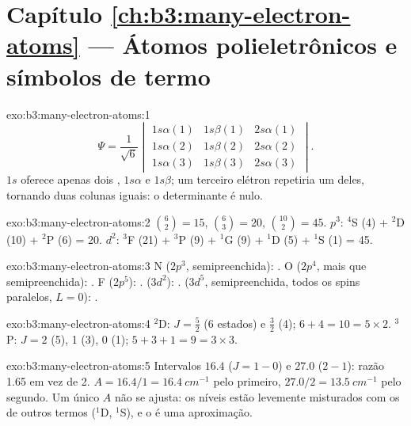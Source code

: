 \section*{Capítulo \ref{ch:b3:many-electron-atoms} --- Átomos polieletrônicos e símbolos de termo}

\begin{solution}{exo:b3:many-electron-atoms:1}
\[
\Psi = \frac{1}{\sqrt6}\begin{vmatrix}1s\alpha(1) & 1s\beta(1) & 2s\alpha(1)\\
1s\alpha(2) & 1s\beta(2) & 2s\alpha(2)\\ 1s\alpha(3) & 1s\beta(3) & 2s\alpha(3)
\end{vmatrix}.
\]
$1s$ oferece apenas dois , $1s\alpha$ e $1s\beta$; um terceiro elétron
repetiria um deles, tornando duas colunas iguais: o determinante é nulo.
\end{solution}

\begin{solution}{exo:b3:many-electron-atoms:2}
$\binom62 = 15$, $\binom63 = 20$, $\binom{10}{2} = 45$. $p^3$: ${}^4$S (4) +
${}^2$D (10) + ${}^2$P (6) = 20. $d^2$: ${}^3$F (21) + ${}^3$P (9) + ${}^1$G (9) +
${}^1$D (5) + ${}^1$S (1) = 45.
\end{solution}

\begin{solution}{exo:b3:many-electron-atoms:3}
N ($2p^3$, semipreenchida): . O ($2p^4$, mais que semipreenchida):
. F ($2p^5$): .  ($3d^2$):
.  ($3d^5$, semipreenchida, todos os spins paralelos, $L = 0$):
.
\end{solution}

\begin{solution}{exo:b3:many-electron-atoms:4}
${}^2$D: $J = \frac52$ (6 estados) e $\frac32$ (4); $6 + 4 = 10 = 5 \times 2$.
${}^3$P: $J = 2$ (5), 1 (3), 0 (1); $5 + 3 + 1 = 9 = 3 \times 3$.
\end{solution}

\begin{solution}{exo:b3:many-electron-atoms:5}
Intervalos $16.4$ ($J = 1 - 0$) e $27.0$ ($2 - 1$): razão 1.65 em vez de 2.
$A = 16.4/1 = \qty{16.4}{cm^{-1}}$ pelo primeiro, $27.0/2 = \qty{13.5}{cm^{-1}}$
pelo segundo. Um único $A$ não se ajusta: os níveis estão levemente misturados
com os de outros termos (${}^1$D, ${}^1$S), e o 
é uma aproximação.
\end{solution}

